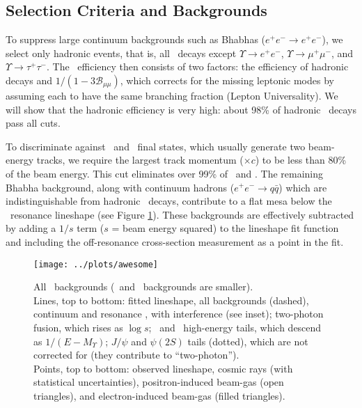\documentclass[aps,prd,preprint,superscriptaddress,tightenlines,nofootinbib,floatfix]{revtex4}
\begin{document}
%
\subsection{Selection Criteria and Backgrounds} \label{sec:back}
%

To suppress large continuum backgrounds such as Bhabhas ($e^+e^- \to
e^+e^-$), we select only hadronic events, that is, all \ups\ decays
except $\Upsilon \to e^+e^-$, $\Upsilon \to \mu^+\mu^-$, and $\Upsilon
\to \tau^+\tau^-$.  The \ups\ efficiency then consists of two factors:
the efficiency of hadronic decays and $1/(1 - 3
\mathcal{B}_{\mu\mu})$, which corrects for the missing leptonic modes
by assuming each to have the same branching fraction (Lepton
Universality).  We will show that the hadronic efficiency is very
high: about 98\% of hadronic \ups\ decays pass all cuts.

To discriminate against \ee\ and \mm\ final states, which usually
generate two beam-energy tracks, we require the largest track momentum
($\times c$) to be less than 80\% of the beam energy.  This cut
eliminates over 99\% of \ee\ and \mm.  The remaining Bhabha
background, along with continuum hadrons ($e^+e^- \to q\bar{q}$) which
are indistinguishable from hadronic \ups\ decays, contribute to a flat
mesa below the \ups\ resonance lineshape (see Figure
\ref{fig:awesome}).  These backgrounds are effectively subtracted by
adding a $1/s$ term ($s$ = beam energy squared) to the lineshape fit
function and including the off-resonance cross-section measurement as
a point in the fit.

\begin{figure}[p]
  \texttt{[image: ../plots/awesome]}

  \caption{\label{fig:awesome} All \uthree\ backgrounds (\uone\ and
  \utwo\ backgrounds are smaller).  \vspace{0.2 cm} \\
  Lines, top to bottom: fitted lineshape, all backgrounds (dashed),
  continuum and resonance \tautau, with interference (see inset);
  two-photon fusion, which rises as $\log s$; \utwo\ and \uone\
  high-energy tails, which descend as $1/(E-M_\Upsilon)$; $J/\psi$ and
  $\psi(2S)$ tails (dotted), which are not corrected for (they
  contribute to ``two-photon''). \vspace{0.2 cm} \\
  Points, top to bottom: observed lineshape, cosmic rays (with
  statistical uncertainties), positron-induced beam-gas (open
  triangles), and electron-induced beam-gas (filled triangles).}
\end{figure}
\end{document}

